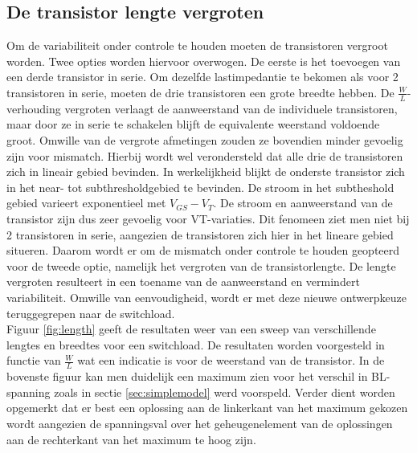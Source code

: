 \subsection{De transistor lengte vergroten}\label{sec:finaleload}
Om de variabiliteit onder controle te houden moeten de transistoren vergroot worden. Twee opties worden hiervoor overwogen. De eerste is het toevoegen van een derde transistor in serie. Om dezelfde lastimpedantie te bekomen als voor 2 transistoren in serie, moeten de drie transistoren een grote breedte hebben. De $\frac{W}{L}$-verhouding vergroten verlaagt de aanweerstand van de individuele transistoren, maar door ze in serie te schakelen blijft de equivalente weerstand voldoende groot. Omwille van de vergrote afmetingen zouden ze bovendien minder gevoelig zijn voor mismatch. Hierbij wordt wel verondersteld dat alle drie de transistoren zich in lineair gebied bevinden. In werkelijkheid blijkt de onderste transistor zich in het near- tot subthresholdgebied te bevinden. De stroom in het subtheshold gebied varieert exponentieel met $V_{GS}-V_{T}$. De stroom en aanweerstand van de transistor zijn dus zeer gevoelig voor VT-variaties. Dit fenomeen ziet men niet bij 2 transistoren in serie, aangezien de transistoren zich hier in het lineare gebied situeren. Daarom wordt er om de mismatch onder controle te houden geopteerd voor de tweede optie, namelijk het vergroten van de transistorlengte. De lengte vergroten resulteert in een toename van de aanweerstand en vermindert variabiliteit. Omwille van eenvoudigheid, wordt er met deze nieuwe ontwerpkeuze teruggegrepen naar de switchload.\\
Figuur \ref{fig:length} geeft de resultaten weer van een sweep van verschillende lengtes en breedtes voor een switchload. De resultaten worden voorgesteld in functie van $\frac{W}{L}$ wat een indicatie is voor de weerstand van de transistor. In de bovenste figuur kan men duidelijk een maximum zien voor het verschil in BL-spanning zoals in sectie \ref{sec:simplemodel} werd voorspeld. Verder dient worden opgemerkt dat er best een oplossing aan de linkerkant van het maximum gekozen wordt aangezien de spanningsval over het geheugenelement van de oplossingen aan de rechterkant van het maximum te hoog zijn.
